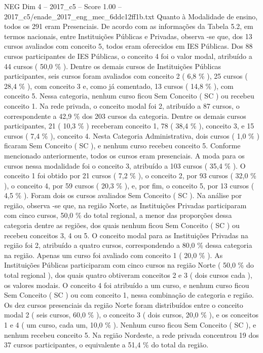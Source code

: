 \begin{textsample}{NEG Dim 4 – 2017\_c5 – Score 1.00 – 2017\_c5/enade\_2017\_eng\_mec\_6ddc12ff1b.txt}
Quanto à Modalidade de ensino, todos os 291 eram Presenciais.
De acordo com as informações da Tabela 5.2, em termos nacionais, entre Instituições Públicas e Privadas, observa -se que, dos 13 cursos avaliados com conceito 5, todos eram oferecidos em IES Públicas.
Dos 88 cursos participantes de IES Públicas, o conceito 4 foi o valor modal, atribuído a 44 cursos ( 50,0 \% ).
Dentre os demais cursos de Instituições Públicas participantes, seis cursos foram avaliados com conceito 2 ( 6,8 \% ), 25 cursos ( 28,4 \% ), com conceito 3 e, como já comentado, 13 cursos ( 14,8 \% ), com conceito 5.
Nessa categoria, nenhum curso ficou Sem Conceito ( SC ) ou recebeu conceito 1.
Na rede privada, o conceito modal foi 2, atribuído a 87 cursos, o correspondente a 42,9 \% dos 203 cursos da categoria.
Dentre os demais cursos participantes, 21 ( 10,3 \% ) receberam conceito 1, 78 ( 38,4 \% ), conceito 3, e 15 cursos ( 7,4 \% ), conceito 4.
Nesta Categoria Administrativa, dois cursos ( 1,0 \% ) ficaram Sem Conceito ( SC ), e nenhum curso recebeu conceito 5.
Conforme mencionado anteriormente, todos os cursos eram presenciais.
A moda para os cursos nessa modalidade foi o conceito 3, atribuído a 103 cursos ( 35,4 \% ).
O conceito 1 foi obtido por 21 cursos ( 7,2 \% ), o conceito 2, por 93 cursos ( 32,0 \% ), o conceito 4, por 59 cursos ( 20,3 \% ), e, por fim, o conceito 5, por 13 cursos ( 4,5 \% ).
Foram dois os cursos avaliados Sem Conceito ( SC ).
Na análise por região, observa -se que, na região Norte, as Instituições Privadas participaram com cinco cursos, 50,0 \% do total regional, a menor das proporções dessa categoria dentre as regiões, dos quais nenhum ficou Sem Conceito ( SC ) ou recebeu conceitos 3, 4 ou 5.
O conceito modal para as Instituições Privadas na região foi 2, atribuído a quatro cursos, correspondendo a 80,0 \% dessa categoria na região.
Apenas um curso foi avaliado com conceito 1 ( 20,0 \% ).
As Instituições Públicas participaram com cinco cursos na região Norte ( 50,0 \% do total regional ), dos quais quatro obtiveram conceitos 2 e 3 ( dois cursos cada ), os valores modais.
O conceito 4 foi atribuído a um curso, e nenhum curso ficou Sem Conceito ( SC ) ou com conceito 1, nessa combinação de categoria e região.
Os dez cursos presenciais da região Norte foram distribuídos entre o conceito modal 2 ( seis cursos, 60,0 \% ), o conceito 3 ( dois cursos, 20,0 \% ), e os conceitos 1 e 4 ( um curso, cada um, 10,0 \% ).
Nenhum curso ficou Sem Conceito ( SC ), e nenhum recebeu conceito 5.
Na região Nordeste, a rede privada concentrou 19 dos 37 cursos participantes, o equivalente a 51,4 \% do total da região.

\end{textsample}
